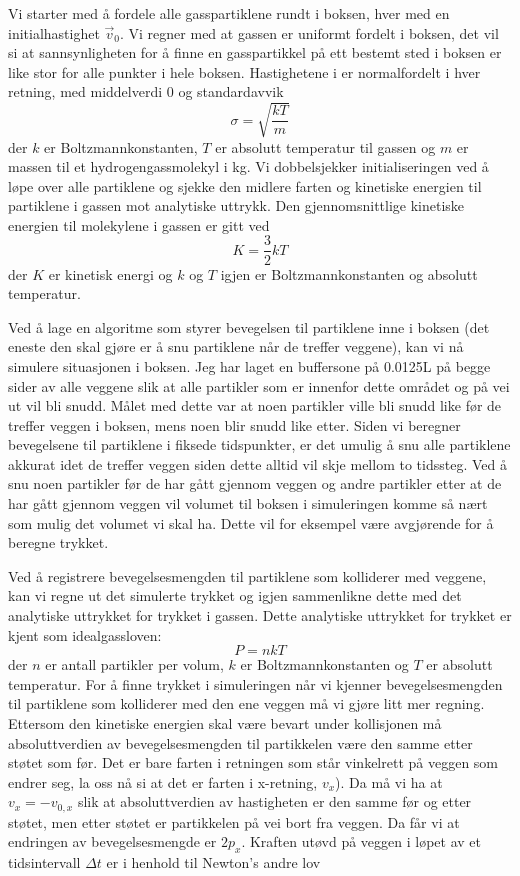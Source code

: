 \documentclass[reprint,english,notitlepage]{revtex4-1}  %
\begin{document}
Vi starter med å fordele alle gasspartiklene rundt i boksen, hver med en initialhastighet
 $\vec{v}_0$. Vi regner med at gassen er uniformt fordelt i boksen, det vil si at sannsynligheten for å finne en gasspartikkel på ett bestemt sted i boksen er like stor for alle punkter i hele boksen. Hastighetene i er normalfordelt i hver retning, med middelverdi 0 og standardavvik
 \[
 \sigma = \sqrt{\frac{kT}{m}}
 \]
 der $k$ er Boltzmannkonstanten, $T$ er absolutt temperatur til gassen og $m$ er massen til et hydrogengassmolekyl i kg. Vi dobbelsjekker initialiseringen ved å løpe over alle partiklene og sjekke den midlere farten og kinetiske energien til partiklene i gassen mot analytiske uttrykk. Den gjennomsnittlige kinetiske energien til molekylene i gassen er gitt ved
 \begin{equation}
 \label{eq:kinetic}
 K = \frac{3}{2}kT
 \end{equation}
 der $K$ er kinetisk energi og $k$ og $T$ igjen er Boltzmannkonstanten og absolutt temperatur.

Ved å lage en algoritme som styrer bevegelsen til partiklene inne i boksen (det eneste den
 skal gjøre er å snu partiklene når de treffer veggene), kan vi nå simulere situasjonen i boksen. Jeg har laget en buffersone på 0.0125L på begge sider av alle veggene slik at alle partikler som er innenfor dette området og på vei ut vil bli snudd. Målet med dette var at noen partikler ville bli snudd like før de treffer veggen i boksen, mens noen blir snudd like etter. Siden vi beregner bevegelsene til partiklene i fiksede tidspunkter, er det umulig å snu alle partiklene akkurat idet de treffer veggen siden dette alltid vil skje mellom to tidssteg. Ved å snu noen partikler før de har gått gjennom veggen og andre partikler etter at de har gått gjennom veggen vil volumet til boksen i simuleringen komme så nært som mulig det volumet vi skal ha. Dette vil for eksempel være avgjørende for å beregne trykket.

Ved å registrere bevegelsesmengden til partiklene som kolliderer med veggene, kan vi regne
 ut det simulerte trykket og igjen sammenlikne dette med det analytiske uttrykket for trykket i gassen. Dette analytiske uttrykket for trykket er kjent som idealgassloven:
 \[
 P = nkT
 \]
 der $n$ er antall partikler per volum, $k$ er Boltzmannkonstanten og $T$ er absolutt temperatur. For å finne trykket i simuleringen når vi kjenner bevegelsesmengden til partiklene som kolliderer med den ene veggen må vi gjøre litt mer regning. Ettersom den kinetiske energien skal være bevart under kollisjonen må absoluttverdien av bevegelsesmengden til partikkelen være den samme etter støtet som før. Det er bare farten i retningen som står vinkelrett på veggen som endrer seg, la oss nå si at det er farten i x-retning, $v_x$). Da må vi ha at $v_x = - v_{0, x}$ slik at absoluttverdien av hastigheten er den samme før og etter støtet, men etter støtet er partikkelen på vei bort fra veggen. Da får vi at endringen av bevegelsesmengde er $2 p_x$. Kraften utøvd på veggen i løpet av et tidsintervall $\Delta t$ er i henhold til Newton's andre lov
\end{document}
